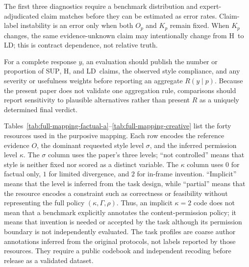 \documentclass{clv2025}
\newcommand{\LD}{\textsc{LD}}
\newcommand{\Hall}{\textsc{H}}
\newcommand{\SUP}{\textsc{SUP}}
\begin{document}
The first three diagnostics require a benchmark distribution and expert-adjudicated claim matches before they can be estimated as error rates.
Claim-label instability is an error only when both $O_p$ and $K_p$ remain fixed.
When $K_p$ changes, the same evidence-unknown claim may intentionally change from \Hall\ to \LD; this is contract dependence, not relative truth.

For a complete response $y$, an evaluation should publish the number or proportion of \SUP, \Hall, and \LD\ claims, the observed style compliance, and any severity or usefulness weights before reporting an aggregate $R(y\mid p)$.
Because the present paper does not validate one aggregation rule, comparisons should report sensitivity to plausible alternatives rather than present $R$ as a uniquely determined final verdict.

%
\makeatletter\def\@currentlabel{B}\makeatother\label{app:mapping}

Tables~\ref{tab:full-mapping-factual-a}--\ref{tab:full-mapping-creative} list the forty resources used in the purposive mapping.
Each row encodes the reference evidence $O$, the dominant requested style level $\sigma$, and the inferred permission level $\kappa$.
The $\sigma$ column uses the paper's three levels; ``not controlled'' means that style is neither fixed nor scored as a distinct variable.
The $\kappa$ column uses $0$ for factual only, $1$ for limited divergence, and $2$ for in-frame invention.
``Implicit'' means that the level is inferred from the task design, while ``partial'' means that the resource encodes a constraint such as correctness or feasibility without representing the full policy $(\kappa,\Gamma,\rho)$.
Thus, an implicit $\kappa=2$ code does not mean that a benchmark explicitly annotates the content-permission policy; it means that invention is needed or accepted by the task although its permission boundary is not independently evaluated.
The task profiles are coarse author annotations inferred from the original protocols, not labels reported by those resources.
They require a public codebook and independent recoding before release as a validated dataset.
\end{document}
